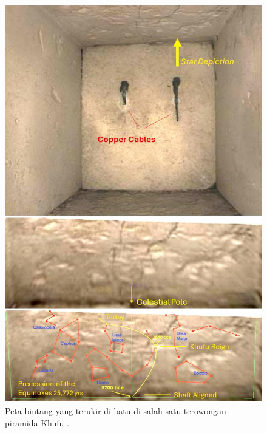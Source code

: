 \documentclass[10pt,twocolumn,letterpaper]{article}
\begin{document}
\begin{figure}[H]
\begin{center}
   \includegraphics[width=1\linewidth]{star-stone.jpg}
\end{center}
   \caption{Peta bintang yang terukir di batu di salah satu terowongan piramida Khufu \cite{28}.}
\label{fig:20}
\label{fig:onecol}
\end{figure}
\end{document}
